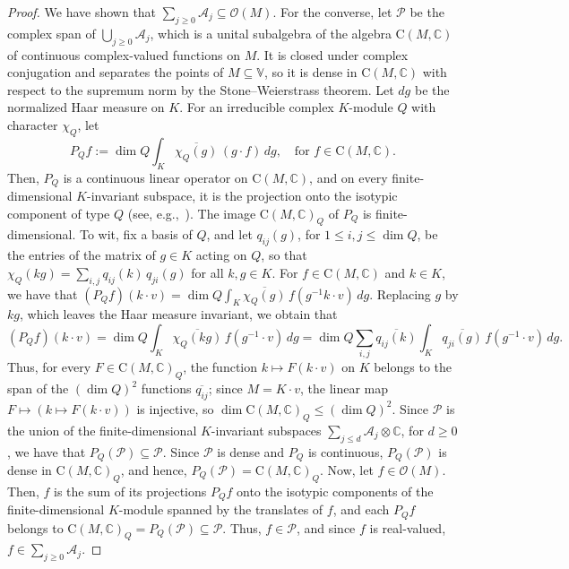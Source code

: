 \documentclass{article}
\newcommand{\C}{\mathbb{C}}
\newcommand{\Ocal}{\mathcal{O}}
\theoremstyle{definition}
\theoremstyle{plain}
\begin{document}
\begin{proof}
We have shown that $\sum_{j\geq0}\mathcal A_j\subseteq\Ocal(M)$.
For the converse, let $\mathcal P$ be the complex span of $\bigcup_{j\geq0}\mathcal A_j$,
which is a unital subalgebra of the algebra $\mathrm{C}(M,\C)$ of continuous complex-valued functions on $M$.
It is closed under complex conjugation and separates the points of $M\subseteq\mathbb V$, so it is dense in $\mathrm{C}(M,\C)$ with respect to the supremum norm by the Stone--Weierstrass theorem.
Let $dg$ be the normalized Haar measure on $K$.
For an irreducible complex $K$-module $Q$ with character $\chi_Q$, let
$$
P_Qf:=\dim Q \int_K \overline{\chi_Q(g)}\,(g\cdot f)\,dg, \quad\mbox{for } f\in\mathrm{C}(M,\C).
$$
Then, $P_Q$ is a continuous linear operator on $\mathrm{C}(M,\C)$, and on every finite-dimensional $K$-invariant subspace, it is the projection onto the isotypic component of type $Q$ (see, e.g.,~\cite[Chapter~II]{BtD}).
The image $\mathrm{C}(M,\C)_Q$ of $P_Q$ is finite-dimensional.
 To wit, fix a basis of $Q$, and let $q_{ij}(g)$, for $1\leq i,j\leq\dim Q$, be the entries of the matrix of $g\in K$ acting on $Q$, so that $\chi_Q(kg)= \sum_{i,j}q_{ij}(k)\,q_{ji}(g)$ for all $k,g\in K$.
For $f\in\mathrm{C}(M,\C)$ and $k\in K$, we have that $(P_Qf)(k\cdot v)=\dim Q\int_K\overline{\chi_Q(g)}\,f(g^{-1}k\cdot v)\,dg$.
Replacing $g$ by $kg$, which leaves the Haar measure invariant, we obtain that
$$
(P_Qf)(k\cdot v)
=\dim Q\int_K \overline{\chi_Q(kg)}\,f(g^{-1}\cdot v)\,dg
=\dim Q\sum_{i,j} \overline{q_{ij}(k)} \int_K\overline{q_{ji}(g)}\,f(g^{-1}\cdot v)\,dg.
$$
Thus, for every $F\in\mathrm{C}(M,\C)_Q$, the function $k\mapsto F(k\cdot v)$ on $K$ belongs to the span of the $(\dim Q)^2$ functions $\overline{q_{ij}}$; since $M=K\cdot v$, the linear map $F\mapsto(k\mapsto F(k\cdot v))$ is injective, so $\dim\mathrm{C}(M,\C)_Q\leq(\dim Q)^2$.
Since $\mathcal P$ is the union of the finite-dimensional $K$-invariant subspaces $\sum_{j \leq d}\mathcal A_j\otimes\C$,
for $d\geq0$, we have that $P_Q( \mathcal P)\subseteq\mathcal P$.
Since $\mathcal P$ is dense and $P_Q$ is continuous, $P_Q(\mathcal P)$ is dense in $\mathrm{C}(M,\C)_Q$, and hence, $P_Q(\mathcal P)=\mathrm{C}(M,\C)_Q$.
Now, let $f\in\Ocal(M)$.
Then, $f$ is the sum of its projections $P_Qf$ onto the isotypic components of the finite-dimensional $K$-module spanned by the translates of $f$, and each $P_Qf$ belongs to $\mathrm{C}(M,\C)_Q=P_Q(\mathcal P)\subseteq\mathcal P$.
Thus, $f\in\mathcal P$, and since $f$ is real-valued, $f\in\sum_{j\geq0}\mathcal A_j$.
\end{proof}
\end{document}
